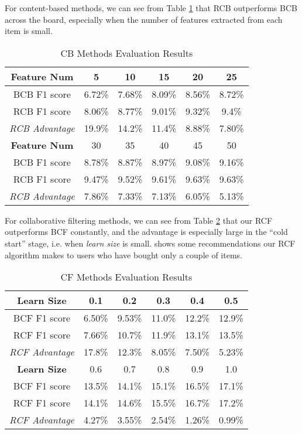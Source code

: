 For content-based methods, we can see from Table \ref{CB} that 
RCB outperforms BCB across the board, especially when the number of features 
extracted from each item is small.

\begin{table}[ht]
\centering
\caption{\label{CB}CB Methods Evaluation Results}
\small
\begin{tabular}{|c|c|c|c|c|c|}
\hline
{\bf Feature Num} & 5 & 10 & 15 & 20 & 25\\
\hline
BCB F1 score& 6.72\% & 7.68\% & 8.09\% & 8.56\% & 8.72\%\\
\hline
RCB F1 score& 8.06\% & 8.77\% & 9.01\% & 9.32\% & 9.4\%\\
\hline
{\em RCB Advantage} & 19.9\% & 14.2\% & 11.4\% & 8.88\% & 7.80\%\\
\hline\hline
{\bf Feature Num} & 30 & 35 & 40 & 45 & 50\\
\hline
BCB F1 score& 8.78\% & 8.87\% & 8.97\% & 9.08\% & 9.16\%\\
\hline
RCB F1 score& 9.47\% & 9.52\% & 9.61\% & 9.63\% & 9.63\%\\
\hline
{\em RCB Advantage} & 7.86\% & 7.33\% & 7.13\% & 6.05\% & 5.13\%\\
\hline
\end{tabular}
\end{table}

For collaborative filtering methods, we can see from Table \ref{CF} 
that our RCF outperforms BCF constantly, and the advantage is especially large 
in the ``cold start'' stage, i.e. when {\em learn size} is small.
 shows some recommendations our RCF algorithm makes
to users who have bought only a couple of items.
 
\begin{table}[ht]
\centering
\caption{\label{CF}CF Methods Evaluation Results}
\small
\begin{tabular}{|c|c|c|c|c|c|}
\hline
{\bf Learn Size} & 0.1 & 0.2 & 0.3 & 0.4 & 0.5\\
\hline
BCF F1 score & 6.50\% & 9.53\% & 11.0\% & 12.2\% & 12.9\%\\
\hline
RCF F1 score & 7.66\% & 10.7\% & 11.9\% & 13.1\% & 13.5\%\\
\hline
{\em RCF Advantage} & 17.8\% & 12.3\% & 8.05\% & 7.50\% & 5.23\%\\
\hline \hline
{\bf Learn Size} & 0.6 & 0.7 & 0.8 & 0.9 & 1.0\\
\hline
BCF F1 score& 13.5\% & 14.1\% & 15.1\% & 16.5\% & 17.1\%\\
\hline
RCF F1 score& 14.1\% & 14.6\% & 15.5\% & 16.7\% & 17.2\%\\
\hline
{\em RCF Advantage} & 4.27\% & 3.55\% & 2.54\% & 1.26\% & 0.99\%\\
\hline
\end{tabular}
\end{table}

